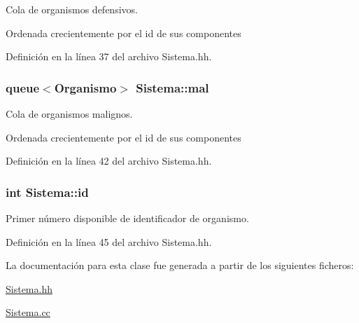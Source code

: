 \-Cola de organismos defensivos. 

\-Ordenada crecientemente por el id de sus componentes 

\-Definición en la línea 37 del archivo \-Sistema.\-hh.

\hypertarget{class_sistema_a11fa1af3dde26025dd10b3ac103f426e}{
\subsubsection[{mal}]{\setlength{\rightskip}{0pt plus 5cm}queue$<${\bf \-Organismo}$>$ {\bf \-Sistema\-::mal}}}\label{class_sistema_a11fa1af3dde26025dd10b3ac103f426e}


\-Cola de organismos malignos. 

\-Ordenada crecientemente por el id de sus componentes 

\-Definición en la línea 42 del archivo \-Sistema.\-hh.

\hypertarget{class_sistema_a69ba5e2cce55afc2a47d899a1100a42a}{
\subsubsection[{id}]{\setlength{\rightskip}{0pt plus 5cm}int {\bf \-Sistema\-::id}}}\label{class_sistema_a69ba5e2cce55afc2a47d899a1100a42a}


\-Primer número disponible de identificador de organismo. 



\-Definición en la línea 45 del archivo \-Sistema.\-hh.



\-La documentación para esta clase fue generada a partir de los siguientes ficheros\-:\begin{DoxyCompactItemize}
\item 
\hyperlink{_sistema_8hh}{\-Sistema.\-hh}\item 
\hyperlink{_sistema_8cc}{\-Sistema.\-cc}\end{DoxyCompactItemize}

